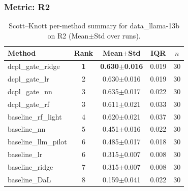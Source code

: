 \subsubsection*{Metric: R2}
\begin{table}[H]
\centering
\scriptsize
\setlength{\tabcolsep}{4pt}
\renewcommand{\arraystretch}{1.1}
\caption{Scott--Knott per-method summary for data\_llama-13b on R2 (Mean$\pm$Std over runs).}
\label{tab:sk_data_llama-13b_R2}
\begin{tabular}{l|c|c|c|c}
\hline
\textbf{Method} & \textbf{Rank} & \textbf{Mean$\pm$Std} & \textbf{IQR} & \textbf{$n$} \\
\hline
\rowcolor{red!15} dcpl\_gate\_ridge & \textbf{1} & \textbf{0.630$\pm$0.016} & 0.019 & 30 \\
dcpl\_gate\_lr & 2 & 0.630$\pm$0.016 & 0.019 & 30 \\
dcpl\_gate\_nn & 3 & 0.635$\pm$0.017 & 0.022 & 30 \\
dcpl\_gate\_rf & 3 & 0.611$\pm$0.021 & 0.033 & 30 \\
baseline\_rf\_light & 4 & 0.620$\pm$0.021 & 0.037 & 30 \\
baseline\_nn & 5 & 0.451$\pm$0.016 & 0.022 & 30 \\
baseline\_llm\_pilot & 6 & 0.485$\pm$0.017 & 0.018 & 30 \\
baseline\_lr & 6 & 0.315$\pm$0.007 & 0.008 & 30 \\
baseline\_ridge & 7 & 0.315$\pm$0.007 & 0.008 & 30 \\
baseline\_DaL & 8 & 0.159$\pm$0.041 & 0.022 & 30 \\
\hline
\end{tabular}
\end{table}

